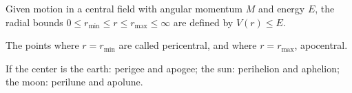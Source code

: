 Given motion in a central field with angular momentum $M$ and energy $E$, the radial bounds $0 \leq r_{\min} \leq r \leq r_{\max} \leq \infty$ are defined by $V(r) \leq E$.

The points where $r = r_{\min}$ are called pericentral, and where $r = r_{\max}$, apocentral.

If the center is the earth: perigee and apogee; the sun: perihelion and aphelion; the moon: perilune and apolune.
